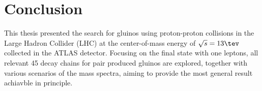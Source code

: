 





\section{Conclusion}
%
%
This thesis presented the search for gluinos using proton-proton collisions in the Large Hadron Collider (LHC) at the center-of-mass energy of $\sqrt{s}=13\tev$ collected in the ATLAS detector. Focusing on the final state with one leptons, all relevant 45 decay chains for pair produced gluinos are explored, together with various scenarios of the mass spectra, aiming to provide the most general result achiavble in principle. \\

